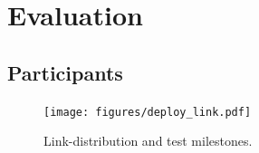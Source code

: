 \documentclass[nofilelist,dvipsnames]{cslthse-msc}
\begin{document}
{%
%
%
%
%
%
%
%
%
	\chapter{Evaluation}

	  \section{Participants}

      \begin{figure}[h!]
        \centering
        \texttt{[image: figures/deploy\_link.pdf]}
        \caption{Link-distribution and test milestones.}
        \label{label_milestones}
      \end{figure}

}
\end{document}
